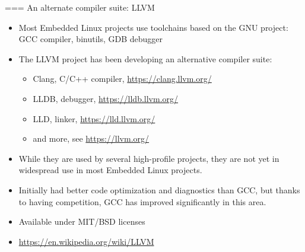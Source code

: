 === {An alternate compiler suite: LLVM}
  \begin{itemize}
  \item Most Embedded Linux projects use toolchains based on the GNU
    project: GCC compiler, binutils, GDB debugger
  \item The LLVM project has been developing an alternative compiler
    suite:
    \begin{itemize}
    \item Clang, C/C++ compiler, \url{https://clang.llvm.org/}
    \item LLDB, debugger, \url{https://lldb.llvm.org/}
    \item LLD, linker, \url{https://lld.llvm.org/}
    \item and more, see \url{https://llvm.org/}
    \end{itemize}
  \item While they are used by several high-profile projects, they are
    not yet in widespread use in most Embedded Linux projects.
  \item Initially had better code optimization and diagnostics than
    GCC, but thanks to having competition, GCC has improved
    significantly in this area.
  \item Available under MIT/BSD licenses
  \item \url{https://en.wikipedia.org/wiki/LLVM}
  \end{itemize}

